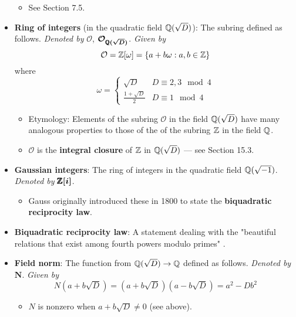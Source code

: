 \documentclass[../notes.tex]{subfiles}
\begin{document}
\begin{itemize}
    \begin{itemize}
        \item See Section 7.5.
    \end{itemize}
    \item \textbf{Ring of integers} (in the quadratic field $\mathbb{Q}(\sqrt{D})$): The subring defined as follows. \emph{Denoted by} $\bm{\mathcal{O}}$, $\bm{\mathcal{O}_{\pmb{\mathbb{Q}}(\sqrt{D})}}$. \emph{Given by}
    \begin{equation*}
        \mathcal{O} = \mathbb{Z}[\omega]
        = \{a+b\omega:a,b\in\mathbb{Z}\}
    \end{equation*}
    where
    \begin{equation*}
        \omega =
        \begin{cases}
            \sqrt{D} & D\equiv 2,3\mod 4\\
            \frac{1+\sqrt{D}}{2} & D\equiv 1\mod 4
        \end{cases}
    \end{equation*}
    \begin{itemize}
        \item Etymology: Elements of the subring $\mathcal{O}$ in the field $\mathbb{Q}(\sqrt{D})$ have many analogous properties to those of the of the subring $\mathbb{Z}$ in the field $\mathbb{Q}$.
        \item $\mathcal{O}$ is the \textbf{integral closure} of $\mathbb{Z}$ in $\mathbb{Q}(\sqrt{D})$ --- see Section 15.3.
    \end{itemize}
    \item \textbf{Gaussian integers}: The ring of integers in the quadratic field $\mathbb{Q}(\sqrt{-1})$. \emph{Denoted by} $\bm{\pmb{\mathbb{Z}}[i]}$.
    \begin{itemize}
        \item Gauss originally introduced these in 1800 to state the \textbf{biquadratic reciprocity law}.
    \end{itemize}
    \item \textbf{Biquadratic reciprocity law}: A statement dealing with the "beautiful relations that exist among fourth powers modulo primes" \parencite[229]{bib:DummitFoote}.
    \item \textbf{Field norm}: The function from $\mathbb{Q}(\sqrt{D})\to\mathbb{Q}$ defined as follows. \emph{Denoted by} $\bm{N}$. \emph{Given by}
    \begin{equation*}
        N(a+b\sqrt{D}) = (a+b\sqrt{D})(a-b\sqrt{D}) = a^2-Db^2
    \end{equation*}
    \begin{itemize}
        \item $N$ is nonzero when $a+b\sqrt{D}\neq 0$ (see above).

\end{itemize}
\end{itemize}
\end{document}

